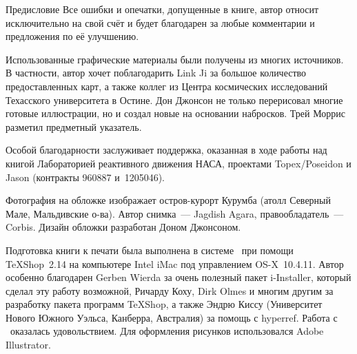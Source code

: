 \begin{chapter}{Предисловие}
Все ошибки и опечатки, допущенные в книге, автор относит исключительно
на свой счёт и будет благодарен за любые комментарии и предложения по
её улучшению.

Использованные графические материалы были получены из многих
источников. В частности, автор хочет поблагодарить Link Ji
за большое количество предоставленных карт,
а также коллег из Центра космических исследований
Техасского университета в Остине. Дон Джонсон не только перерисовал
многие готовые иллюстрации, но и создал новые на основании
набросков. Трей Моррис разметил предметный указатель.

Особой благодарности заслуживает поддержка, оказанная в ходе работы над книгой
Лабораторией реактивного движения НАСА, проектами Topex/Poseidon и Jason
(контракты 960887 и~1205046).

Фотография на обложке изображает остров-курорт Курумба (атолл
Северный Мале, Мальдивские о-ва). Автор снимка~--- Jagdish Agara,
правообладатель~--- Corbis. Дизайн обложки разработан Доном Джонсоном.

Подготовка книги к печати была выполнена в системе \LaTeXe\ при помощи
TeXShop~2.14 на компьютере Intel iMac под управлением OS-X~10.4.11.
Автор особенно благодарен Gerben Wierda за очень полезный пакет i-Installer,
который сделал эту работу возможной, Ричарду Коху, Dirk Olmes
и многим другим за разработку пакета программ TeXShop,
а также Эндрю Киссу (Университет Нового Южного Уэльса, Канберра, Австралия)
за помощь с hyperref.
Работа с \LaTeXe\ оказалась удовольствием.
Для оформления рисунков использовался Adobe Illustrator.
\end{chapter}
